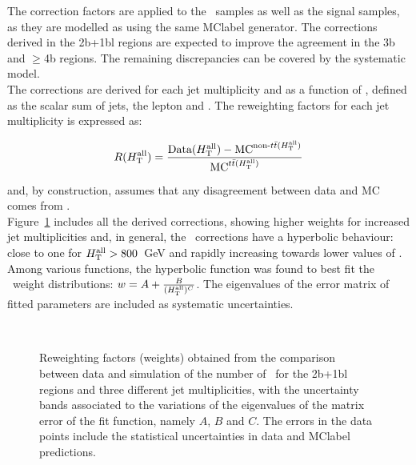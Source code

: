 The correction factors are applied to the \ttbar\ samples as well as the signal samples, as they are modelled as using the same \acrshort{MClabel} generator. The corrections derived in the 2b+1bl regions are expected to improve the agreement in the 3b and $\geq$4b regions. The remaining discrepancies can be covered by the systematic model.\\

The corrections are derived for each jet multiplicity and as a function of \HTall, defined as the scalar \pT sum of jets, the lepton and \MET. The reweighting factors for each jet multiplicity is expressed as:

\begin{equation}
    \label{tqX:RWeq}
    R(H_{\text{T}}^{\text{all}})=\frac{ \text{Data}(H_{\text{T}}^{\text{all}}) - \text{MC}^{\text{non-\ensuremath{t\bar{t}}}(H_{\text{T}}^{\text{all}})} }{\text{MC}^{\text{\ensuremath{t\bar{t}}}(H_{\text{T}}^{\text{all}})}}
\end{equation}

and, by construction, assumes that any disagreement between data and MC comes from \ttbar.\\

Figure~\ref{tqX:RWfactors} includes all the derived corrections, showing higher weights for increased jet multiplicities and, in general, the \HTall\ corrections have a hyperbolic behaviour: close to one for $H_{\text{T}}^{\text{all}} > 800$~GeV and rapidly increasing towards lower values of \HTall. Among various functions, the hyperbolic function was found to best fit the \HTall\ weight distributions: $w=A+\frac{B}{(H_{\text{T}}^{\text{all}})^C}$. The eigenvalues of the error matrix of fitted parameters are included as systematic uncertainties.\\

\begin{figure}[htb]
    \RawFloats
    \begin{center}
     \\
    \caption{Reweighting factors (weights) obtained from the comparison between data and simulation of the number of \HTall\ for the 2b+1bl regions and three different jet multiplicities, with the uncertainty bands associated to the variations of the eigenvalues of the matrix error of the fit function, namely $A$, $B$ and $C$. The errors in the data points include the statistical uncertainties in data and \acrshort{MClabel} predictions.}
    \label{tqX:RWfactors}
\end{center}
\end{figure}

